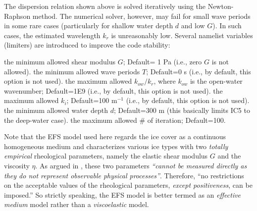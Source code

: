 The dispersion relation shown above is solved iteratively using the Newton-Raphson method. The numerical solver, however, may fail for small wave periods in some rare cases (particularly for shallow water depth $d$ and low $G$). In such cases, the estimated wavelength $k_r$ is unreasonably low. Several namelist variables (limiters) are introduced to improve the code stability:
\begin{clist}
 {the minimum allowed shear modulus $G$; Default= 1 Pa (i.e., zero $G$ is not allowed).}
%
 {the minimum allowed wave periods $T$; Default=0 s (i.e., by default, this option is not used).}
%
 {the maximum allowed $k_{ow}/k_r$, where $k_{ow}$ is the open-water wavenumber; Default=1E9 (i.e., by default, this option is not used).}
%
 {the maximum allowed $k_i$; Default=100 m$^{-1}$ (i.e., by default, this option is not used).}
%
 {the minimum allowed water depth $d$; Default=300 m (this basically limits {\code IC5} to the deep-water case).}
%
 {the maximum allowed \# of iteration; Default=100.}
\end{clist}

Note that the EFS model used here regards the ice cover as a continuous homogeneous medium and characterizes various ice types with two \emph{totally empirical} rheological parameters, namely the elastic shear modulus $G$ and the viscosity $\eta$. As argued in \citet{art:MMS15}, these two parameters \emph{``cannot be measured directly as they do not represent observable physical processes''}. Therefore, ``no restrictions on the acceptable values of the rheological parameters, \emph{except positiveness}, can be imposed.'' So strictly speaking, the EFS model is better termed as an \emph{effective medium} model rather than a \emph{viscoelastic} model.
